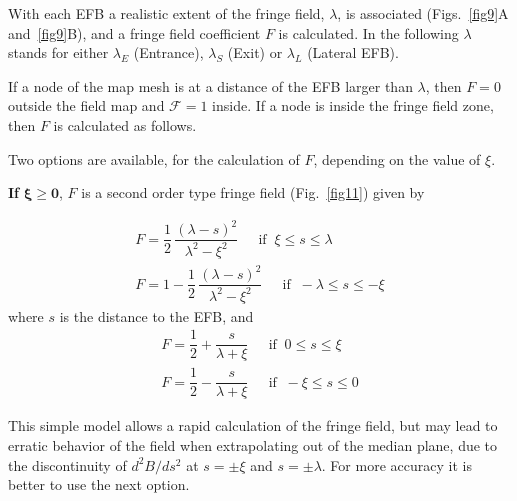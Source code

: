 With  each EFB a realistic extent of the fringe field, $\lambda$, 
is associated (Figs.~\ref{fig9}A and~\ref{fig9}B),  
and a fringe field coefficient $ F$ is 
calculated. In the following $\lambda$ stands for either $ \lambda_ E $
(Entrance), $ \lambda_ S $ (Exit) or $ \lambda_ L $ (Lateral EFB). 
 
\noindent If a node of the map mesh is at a distance of the EFB larger than
$\lambda$, then $ F=0 $ outside the field map and $ \mathcal{F}=1 $ inside.  
If a node is inside the fringe field zone, then $  F$   is calculated as follows. 

\noindent Two options are available, for the calculation of $ F$, depending
on the value of $\xi$. 

\noindent\textbf{If } $\mathbf{\xi  \geq 0}$, $ F $ is a  second
order type fringe field (Fig.~\ref{fig11}) given by 


\begin{gather}
		F  = \dfrac{1 }{ 2} \, \dfrac{(\lambda -s)^2 }{ \lambda^2-\xi^ 2} \quad 
		         ~~ \text{if }~   \xi  \leq  s \leq \lambda  \\
		F  = 1- \dfrac{1 }{ 2} \, \dfrac{(\lambda -s)^2 }{ \lambda^2-\xi^ 2}\quad 
		        ~~ \text{if }~   -\lambda  \leq  s \leq  -\xi 
\end{gather}
where $ s $ is the distance to the EFB, and
\begin{gather}
		 F  = \dfrac{1 }{ 2} + \dfrac{s }{ \lambda +\xi} \quad
		         ~~ \text{if }~  0 \leq  s \leq  \xi  \\
	    F   = \dfrac{1 }{ 2} - \dfrac{s }{ \lambda +\xi}\quad  
		       ~~ \text{if }~   -\xi  \leq  s \leq  0  
\end{gather}
 
\noindent This simple model allows a rapid calculation of the fringe field,
but may lead to erratic behavior of the field when extrapolating out of the median plane, 
due to the discontinuity of $ d^2B/ds^2 $ at $ s=\pm \xi $ and $ s=\pm \lambda $. 
For more accuracy it is better to use the next option. 

